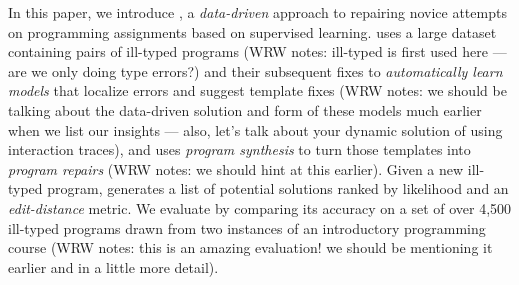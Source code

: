 In this paper, we introduce \toolname, a \emph{data-driven} approach to
repairing novice attempts on programming assignments based on supervised
learning. \toolname uses a large dataset containing pairs of ill-typed
programs (WRW notes: ill-typed is first used here --- are we only doing
type errors?) and
their subsequent fixes to \emph{automatically learn models} that localize
errors and suggest template fixes (WRW notes: we should be talking about
the data-driven solution and form of these models much earlier when we list
our insights --- also, let's talk about your dynamic solution of using
interaction traces), and uses
\emph{program synthesis} to turn those
templates into \emph{program repairs} (WRW notes: we should hint at this
earlier). Given a new ill-typed program, \toolname generates a list of
potential solutions ranked by likelihood and an \emph{edit-distance}
metric. We evaluate \toolname by comparing its accuracy on a set of over
4,500 ill-typed \ocaml programs drawn from two instances of an introductory
programming course (WRW notes: this is an amazing evaluation! we should be
mentioning it earlier and in a little more detail).






